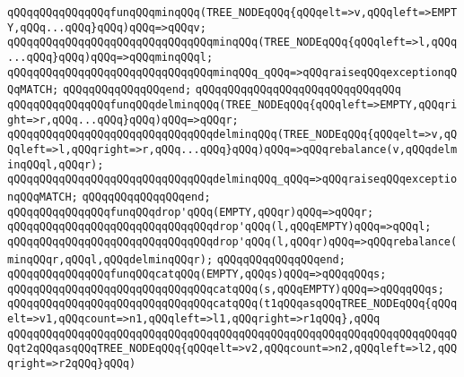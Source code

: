 \newline
\newline
\verb|qQQqqQQqqQQqqQQqfunqQQqminqQQq(TREE_NODEqQQq{qQQqelt=>v,qQQqleft=>EMPTY,qQQq...qQQq}qQQq)qQQq=>qQQqv;|\newline
\verb|qQQqqQQqqQQqqQQqqQQqqQQqqQQqqQQqminqQQq(TREE_NODEqQQq{qQQqleft=>l,qQQq...qQQq}qQQq)qQQq=>qQQqminqQQql;|\newline
\verb|qQQqqQQqqQQqqQQqqQQqqQQqqQQqqQQqminqQQq_qQQq=>qQQqraiseqQQqexceptionqQQqMATCH;|\newline
\verb|qQQqqQQqqQQqqQQqend;|\newline
\verb|qQQqqQQqqQQqqQQqqQQqqQQqqQQqqQQq|\newline
\newline
\verb|qQQqqQQqqQQqqQQqfunqQQqdelminqQQq(TREE_NODEqQQq{qQQqleft=>EMPTY,qQQqright=>r,qQQq...qQQq}qQQq)qQQq=>qQQqr;|\newline
\verb|qQQqqQQqqQQqqQQqqQQqqQQqqQQqqQQqdelminqQQq(TREE_NODEqQQq{qQQqelt=>v,qQQqleft=>l,qQQqright=>r,qQQq...qQQq}qQQq)qQQq=>qQQqrebalance(v,qQQqdelminqQQql,qQQqr);|\newline
\verb|qQQqqQQqqQQqqQQqqQQqqQQqqQQqqQQqdelminqQQq_qQQq=>qQQqraiseqQQqexceptionqQQqMATCH;|\newline
\verb|qQQqqQQqqQQqqQQqend;|\newline
\newline
\newline
\verb|qQQqqQQqqQQqqQQqfunqQQqdrop'qQQq(EMPTY,qQQqr)qQQq=>qQQqr;|\newline
\verb|qQQqqQQqqQQqqQQqqQQqqQQqqQQqqQQqdrop'qQQq(l,qQQqEMPTY)qQQq=>qQQql;|\newline
\verb|qQQqqQQqqQQqqQQqqQQqqQQqqQQqqQQqdrop'qQQq(l,qQQqr)qQQq=>qQQqrebalance(minqQQqr,qQQql,qQQqdelminqQQqr);|\newline
\verb|qQQqqQQqqQQqqQQqend;|\newline
\newline
\newline
\verb|qQQqqQQqqQQqqQQqfunqQQqcatqQQq(EMPTY,qQQqs)qQQq=>qQQqqQQqs;|\newline
\verb|qQQqqQQqqQQqqQQqqQQqqQQqqQQqqQQqcatqQQq(s,qQQqEMPTY)qQQq=>qQQqqQQqs;|\newline
\newline
\verb|qQQqqQQqqQQqqQQqqQQqqQQqqQQqqQQqcatqQQq(t1qQQqasqQQqTREE_NODEqQQq{qQQqelt=>v1,qQQqcount=>n1,qQQqleft=>l1,qQQqright=>r1qQQq},qQQq|\newline
\verb|qQQqqQQqqQQqqQQqqQQqqQQqqQQqqQQqqQQqqQQqqQQqqQQqqQQqqQQqqQQqqQQqqQQqqQQqt2qQQqasqQQqTREE_NODEqQQq{qQQqelt=>v2,qQQqcount=>n2,qQQqleft=>l2,qQQqright=>r2qQQq}qQQq)|\newline
